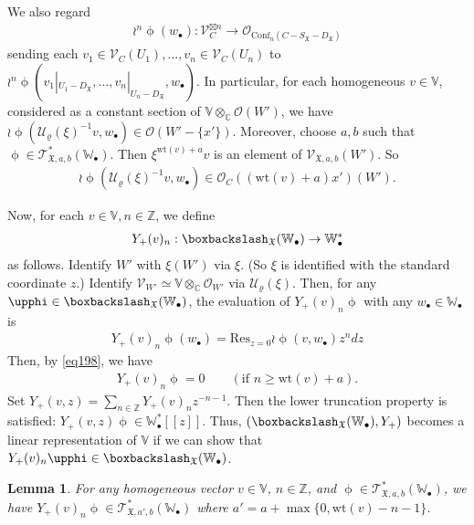 \documentclass[12pt,a4paper,notitlepage]{report}
\theoremstyle{definition}
\theoremstyle{plain}
\newtheorem{lm}[df]{Lemma}
\newcommand{\fk}{\mathfrak}
\newcommand{\mc}{\mathcal}
\newcommand{\Conf}{\mathrm{Conf}}
\newcommand{\Res}{\mathrm{Res}}
\newcommand{\scr}{\mathscr}
\newcommand{\SX}{S_{\fk X}}
\newcommand{\DX}{D_{\fk X}}
\newcommand{\blt}{\bullet}
\newcommand{\Vbb}{\mathbb V}
\newcommand{\Wbb}{\mathbb W}
\newcommand{\Cbb}{\mathbb C}
\newcommand{\Zbb}{\mathbb Z}
\newcommand{\wt}{\mathrm{wt}}
\numberwithin{equation}{section}
\begin{document}
We also regard
\begin{gather*}
\wr^n\upphi(w_\blt):\scr V_C^{\boxtimes n}\rightarrow\scr O_{\Conf_n(C-\SX-\DX)}
\end{gather*}
sending each $v_1\in \scr V_C(U_1),\dots,v_n\in\scr V_C(U_n)$ to $\wr^n\upphi(v_1|_{U_1-\DX},\dots,v_n|_{U_n-\DX},w_\blt)$. In particular, for each homogeneous $v\in\Vbb$, considered as a constant section of $\Vbb\otimes_\Cbb\scr O(W')$, we have $\wr\upphi(\mc U_\varrho(\xi)^{-1} v,w_\blt)\in\scr O(W'-\{x'\})$. Moreover, choose $a,b$ such that $\upphi\in\scr T_{\fk X,a,b}^*(\Wbb_\blt)$. Then $\xi^{\wt(v)+a}v$ is an element of $\scr V_{\fk X,a,b}(W')$. So 
\begin{gather}
\wr\upphi(\mc U_\varrho(\xi)^{-1} v,w_\blt)\in \scr O_C((\wt(v)+a)x')(W').\label{eq198}
\end{gather}

Now, for each $v\in\Vbb,n\in\Zbb$, we define
\begin{gather*}
Y_+(v)_n:\boxbackslash_{\fk X}(\Wbb_\blt)\rightarrow\Wbb_\blt^*
\end{gather*}
as follows. Identify $W'$ with $\xi(W')$ via $\xi$. (So $\xi$ is identified with the standard coordinate $z$.) Identify  $\scr V_{W'}\simeq\Vbb\otimes_\Cbb\scr O_{W'}$ via $\mc U_\varrho(\xi)$.  Then, for any $\upphi\in\boxbackslash_{\fk X}(\Wbb_\blt)$, the evaluation of $Y_+(v)_n\upphi$ with any $w_\blt\in\Wbb_\blt$ is
\begin{gather}
\boxed{~~Y_+(v)_n\upphi(w_\blt)=\Res_{z=0}\wr\upphi( v,w_\blt)z^ndz~~}\label{eq199}
\end{gather}
Then, by \eqref{eq198}, we have
\begin{align}
Y_+(v)_n\upphi=0\qquad (\text{if }n\geq \wt(v)+a).\label{eq200}
\end{align}
Set $Y_+(v,z)=\sum_{n\in\Zbb}Y_+(v)_nz^{-n-1}$.  Then the lower truncation property is satisfied: $Y_+(v,z)\upphi\in \Wbb_\blt^*[[z]]$.  Thus, $(\boxbackslash_{\fk X}(\Wbb_\blt),Y_+)$ becomes a linear representation of $\Vbb$ if we can show that $Y_+(v)_n\upphi\in \boxbackslash_{\fk X}(\Wbb_\blt)$.

\begin{lm}\label{lb93}
For any homogeneous vector $v\in\Vbb$, $n\in\Zbb$, and $\upphi\in\scr T_{\fk X,a,b}^*(\Wbb_\blt)$, we have $Y_+(v)_n\upphi\in \scr T_{\fk X,a',b}^*(\Wbb_\blt)$ where $a'=a+\max\{0,\wt(v)-n-1\}$.
\end{lm}
\end{document}
